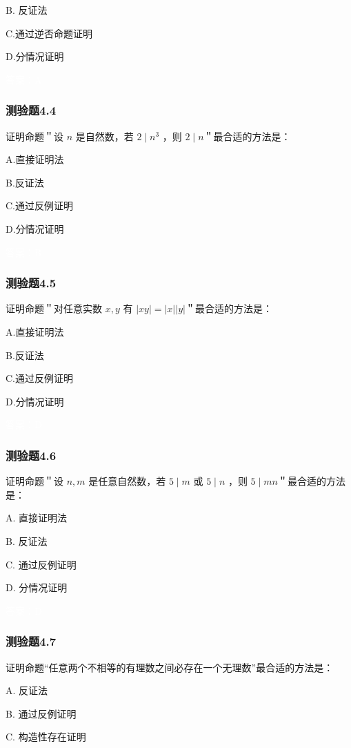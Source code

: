 \documentclass[UTF8, heading=true]{ctexart}
\begin{document}
B. 反证法

C.通过逆否命题证明

D.分情况证明

\textcolor{white}{答案：A}


\subsubsection{测验题4.4}

证明命题＂设 $n$ 是自然数，若 $2 \mid n^3$ ，则 $2 \mid n$＂最合适的方法是：

A.直接证明法

B.反证法

C.通过反例证明

D.分情况证明

\textcolor{white}{答案：B}

\subsubsection{测验题4.5}

证明命题＂对任意实数 $x, y$ 有 $|x y|=|x||y|$＂最合适的方法是：

A.直接证明法

B.反证法

C.通过反例证明

D.分情况证明

\textcolor{white}{答案：D}

\subsubsection{测验题4.6}

证明命题＂设 $n, m$ 是任意自然数，若 $5 \mid m$ 或 $5 \mid n$ ，则 $5 \mid m n$＂最合适的方法是：

A. 直接证明法

B. 反证法

C. 通过反例证明

D.  分情况证明

\textcolor{white}{答案：D}

\subsubsection{测验题4.7}

证明命题“任意两个不相等的有理数之间必存在一个无理数”最合适的方法是：

A. 反证法

B.  通过反例证明

C. 构造性存在证明
\end{document}
